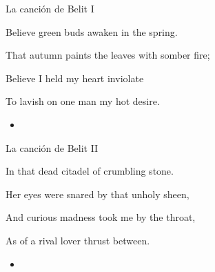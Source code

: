 \begin{frame}{La canción de Belit I}
	\begin{exampleblock}{}
		Believe green buds awaken in the spring.

		That autumn paints the leaves with somber fire;

		Believe I held my heart inviolate

		To lavish on one man my hot desire.
	\end{exampleblock}

	\begin{itemize}
		\item \textit{  }
	\end{itemize}
\end{frame}
\note[itemize]{
	\item
}

\begin{frame}{La canción de Belit II}
	\begin{exampleblock}{}
		In that dead citadel of crumbling stone.

		Her eyes were snared by that unholy sheen,

		And curious madness took me by the throat,

		As of a rival lover thrust between.
	\end{exampleblock}

	\begin{itemize}
		\item \textit{  }
	\end{itemize}
\end{frame}
\note[itemize]{
	\item
}

